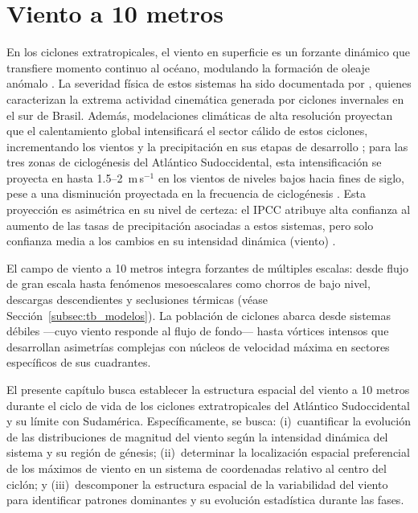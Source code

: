 \chapter{Viento a 10 metros}\label{cap:resultados_wind10}

En los ciclones extratropicales, el viento en superficie es un forzante dinámico que transfiere momento continuo al océano, modulando la formación de oleaje anómalo \citep{gramcianinov2023impact}.
La severidad física de estos sistemas ha sido documentada por \citet{bartolomei2024extremos}, quienes caracterizan la extrema actividad cinemática generada por ciclones invernales en el sur de Brasil. 
Además, modelaciones climáticas de alta resolución proyectan que el calentamiento global intensificará el sector cálido de estos ciclones, incrementando los vientos y la precipitación en sus etapas de desarrollo \citep{gentile2025response}; para las tres zonas de ciclogénesis del Atlántico Sudoccidental, esta intensificación se proyecta en hasta 1.5--2~m\,s$^{-1}$ en los vientos de niveles bajos hacia fines de siglo, pese a una disminución proyectada en la frecuencia de ciclogénesis \citep{dejesus2021multimodel}. Esta proyección es asimétrica en su nivel de certeza: el IPCC atribuye alta confianza al aumento de las tasas de precipitación asociadas a estos sistemas, pero solo confianza media a los cambios en su intensidad dinámica (viento) \citep{IPCC2021_WG1_Chapter11_Extremes}.

El campo de viento a 10 metros integra forzantes de múltiples escalas: desde flujo de gran escala hasta fenómenos mesoescalares como chorros de bajo nivel, descargas descendientes y seclusiones térmicas (véase Sección~\ref{subsec:tb_modelos}). 
La población de ciclones abarca desde sistemas débiles —cuyo viento responde al flujo de fondo— hasta vórtices intensos que desarrollan asimetrías complejas con núcleos de velocidad máxima en sectores específicos de sus cuadrantes.

El presente capítulo busca establecer la estructura espacial del viento a 10 metros durante el ciclo de vida de los ciclones extratropicales del Atlántico Sudoccidental y su límite con Sudamérica. 
Específicamente, se busca: (i)~cuantificar la evolución de las distribuciones de magnitud del viento según la intensidad dinámica del sistema y su región de génesis; (ii)~determinar la localización espacial preferencial de los máximos de viento en un sistema de coordenadas relativo al centro del ciclón; y (iii)~descomponer la estructura espacial de la variabilidad del viento para identificar patrones dominantes y su evolución estadística durante las fases.

